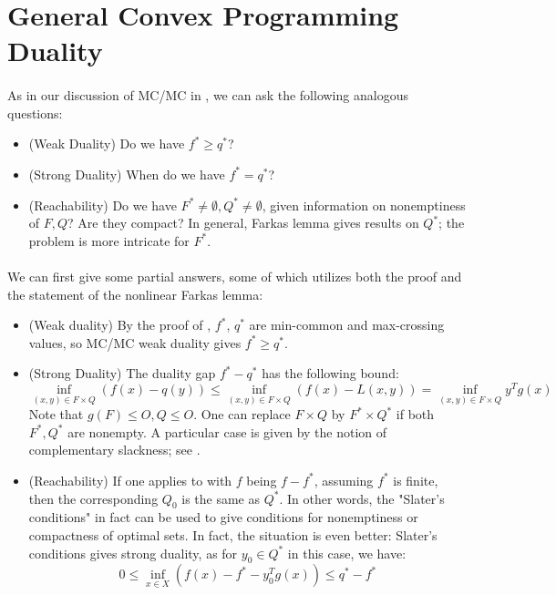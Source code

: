 \section{General Convex Programming Duality}
\label{sect:042}

\paragraph{}As in our discussion of MC/MC in , we can ask the following analogous questions:
\begin{itemize}
	\item (Weak Duality) Do we have $f^\ast\geq q^\ast$?
	\item (Strong Duality) When do we have $f^\ast=q^\ast$?
	\item (Reachability) Do we have $F^\ast\neq\emptyset,Q^\ast\neq\emptyset$, given information on nonemptiness of $F,Q$? Are they compact? In general, Farkas lemma gives results on $Q^\ast$; the problem is more intricate for $F^\ast$.
\end{itemize}

\paragraph{}We can first give some partial answers, some of which utilizes both the proof and the statement of the nonlinear Farkas lemma:
\begin{itemize}
	\item (Weak duality) By the proof of , $f^\ast$, $q^\ast$ are min-common and max-crossing values, so MC/MC weak duality gives $f^\ast\geq q^\ast$.
	\item (Strong Duality) The duality gap $f^\ast-q^\ast$ has the following bound:
	      \[
		      \underset{(x,y)\in F\times Q}{\operatorname{inf}}\left(f(x)-q(y)\right)\leq
		      \underset{(x,y)\in F\times Q}{\operatorname{inf}}\left(f(x)-L(x,y)\right)=
		      \underset{(x,y)\in F\times Q}{\operatorname{inf}}y^Tg(x)
	      \]
	      Note that $g(F)\leq O,Q\leq O$. One can replace $F\times Q$ by $F^\ast\times Q^\ast$ if both $F^\ast,Q^\ast$ are nonempty. A particular case is given by the notion of complementary slackness; see .
	\item (Reachability) If one applies  to  with $f$ being $f-f^\ast$, assuming $f^\ast$ is finite, then the corresponding $Q_0$ is the same as $Q^\ast$. In other words, the "Slater's conditions" in fact can be used to give conditions for nonemptiness or compactness of optimal sets. In fact, the situation is even better: Slater's conditions gives strong duality, as for $y_0\in Q^\ast$ in this case, we have:
	      \[
		      0\leq \underset{x\in X}{\operatorname{inf}} \left(f(x)-f^\ast-y_0^T g(x)\right) \leq q^\ast-f^\ast
	      \]
\end{itemize}

